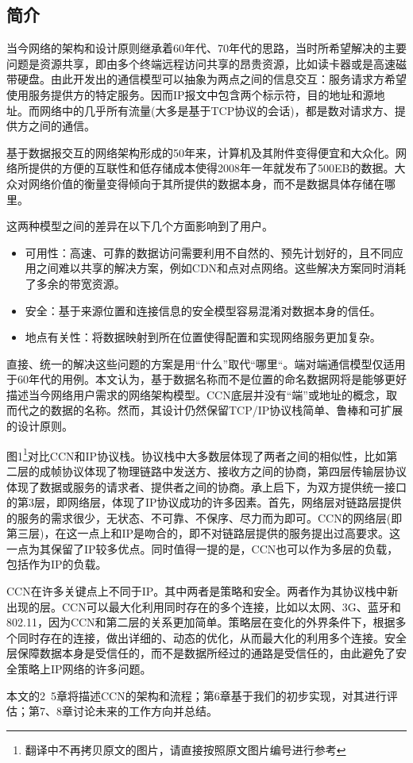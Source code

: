 \subsection{简介}
当今网络的架构和设计原则继承着60年代、70年代的思路，当时所希望解决的主要问题是资源共享，即由多个终端远程访问共享的昂贵资源，比如读卡器或是高速磁带硬盘。由此开发出的通信模型可以抽象为两点之间的信息交互：服务请求方希望使用服务提供方的特定服务。因而IP报文中包含两个标示符，目的地址和源地址。而网络中的几乎所有流量(大多是基于TCP协议的会话)，都是数对请求方、提供方之间的通信。
\par
基于数据报交互的网络架构形成的50年来，计算机及其附件变得便宜和大众化。网络所提供的方便的互联性和低存储成本使得2008年一年就发布了500EB的数据。大众对网络价值的衡量变得倾向于其所提供的数据本身，而不是数据具体存储在哪里。
\par
这两种模型之间的差异在以下几个方面影响到了用户。
\begin{itemize}
\item
可用性：高速、可靠的数据访问需要利用不自然的、预先计划好的，且不同应用之间难以共享的解决方案，例如CDN和点对点网络。这些解决方案同时消耗了多余的带宽资源。
\item
安全：基于来源位置和连接信息的安全模型容易混淆对数据本身的信任。
\item
地点有关性：将数据映射到所在位置使得配置和实现网络服务更加复杂。
\end{itemize}
\par
直接、统一的解决这些问题的方案是用“什么”取代“哪里“。端对端通信模型仅适用于60年代的用例。本文认为，基于数据名称而不是位置的命名数据网将是能够更好描述当今网络用户需求的网络架构模型。CCN底层并没有“端”或地址的概念，取而代之的数据的名称。然而，其设计仍然保留TCP/IP协议栈简单、鲁棒和可扩展的设计原则。
\par
图1\footnote{翻译中不再拷贝原文的图片，请直接按照原文图片编号进行参考}对比CCN和IP协议栈。协议栈中大多数层体现了两者之间的相似性，比如第二层的成帧协议体现了物理链路中发送方、接收方之间的协商，第四层传输层协议体现了数据或服务的请求者、提供者之间的协商。承上启下，为双方提供统一接口的第3层，即网络层，体现了IP协议成功的许多因素。首先，网络层对链路层提供的服务的需求很少，无状态、不可靠、不保序、尽力而为即可。CCN的网络层(即第三层)，在这一点上和IP是吻合的，即不对链路层提供的服务提出过高要求。这一点为其保留了IP较多优点。同时值得一提的是，CCN也可以作为多层的负载，包括作为IP的负载。
\par
CCN在许多关键点上不同于IP。其中两者是策略和安全。两者作为其协议栈中新出现的层。CCN可以最大化利用同时存在的多个连接，比如以太网、3G、蓝牙和802.11，因为CCN和第二层的关系更加简单。策略层在变化的外界条件下，根据多个同时存在的连接，做出详细的、动态的优化，从而最大化的利用多个连接。安全层保障数据本身是受信任的，而不是数据所经过的通路是受信任的，由此避免了安全策略上IP网络的许多问题。
\par
本文的2~5章将描述CCN的架构和流程；第6章基于我们的初步实现，对其进行评估；第7、8章讨论未来的工作方向并总结。
\par
